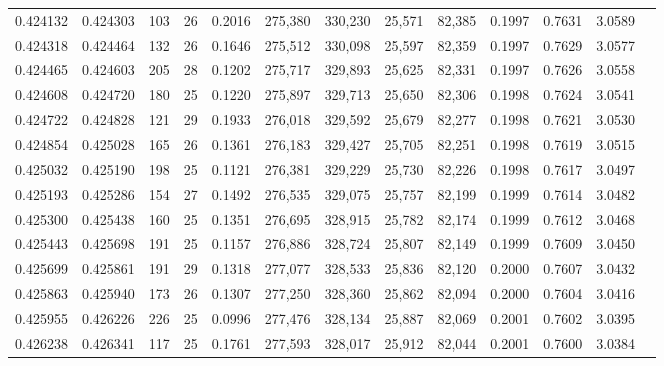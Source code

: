 \begin{tabular}{rrrrrrrrrrrrr}
0.424132 & 0.424303 &   103 &  26 &                                     0.2016 & 275,380 & 330,230 &  25,571 &  82,385 & 0.1997 & 0.7631 & 3.0589 \\
0.424318 & 0.424464 &   132 &  26 &                                     0.1646 & 275,512 & 330,098 &  25,597 &  82,359 & 0.1997 & 0.7629 & 3.0577 \\
0.424465 & 0.424603 &   205 &  28 &                                     0.1202 & 275,717 & 329,893 &  25,625 &  82,331 & 0.1997 & 0.7626 & 3.0558 \\
0.424608 & 0.424720 &   180 &  25 &                                     0.1220 & 275,897 & 329,713 &  25,650 &  82,306 & 0.1998 & 0.7624 & 3.0541 \\
0.424722 & 0.424828 &   121 &  29 &                                     0.1933 & 276,018 & 329,592 &  25,679 &  82,277 & 0.1998 & 0.7621 & 3.0530 \\
0.424854 & 0.425028 &   165 &  26 &                                     0.1361 & 276,183 & 329,427 &  25,705 &  82,251 & 0.1998 & 0.7619 & 3.0515 \\
0.425032 & 0.425190 &   198 &  25 &                                     0.1121 & 276,381 & 329,229 &  25,730 &  82,226 & 0.1998 & 0.7617 & 3.0497 \\
0.425193 & 0.425286 &   154 &  27 &                                     0.1492 & 276,535 & 329,075 &  25,757 &  82,199 & 0.1999 & 0.7614 & 3.0482 \\
0.425300 & 0.425438 &   160 &  25 &                                     0.1351 & 276,695 & 328,915 &  25,782 &  82,174 & 0.1999 & 0.7612 & 3.0468 \\
0.425443 & 0.425698 &   191 &  25 &                                     0.1157 & 276,886 & 328,724 &  25,807 &  82,149 & 0.1999 & 0.7609 & 3.0450 \\
0.425699 & 0.425861 &   191 &  29 &                                     0.1318 & 277,077 & 328,533 &  25,836 &  82,120 & 0.2000 & 0.7607 & 3.0432 \\
0.425863 & 0.425940 &   173 &  26 &                                     0.1307 & 277,250 & 328,360 &  25,862 &  82,094 & 0.2000 & 0.7604 & 3.0416 \\
0.425955 & 0.426226 &   226 &  25 &                                     0.0996 & 277,476 & 328,134 &  25,887 &  82,069 & 0.2001 & 0.7602 & 3.0395 \\
0.426238 & 0.426341 &   117 &  25 &                                     0.1761 & 277,593 & 328,017 &  25,912 &  82,044 & 0.2001 & 0.7600 & 3.0384 \\

\end{tabular}
